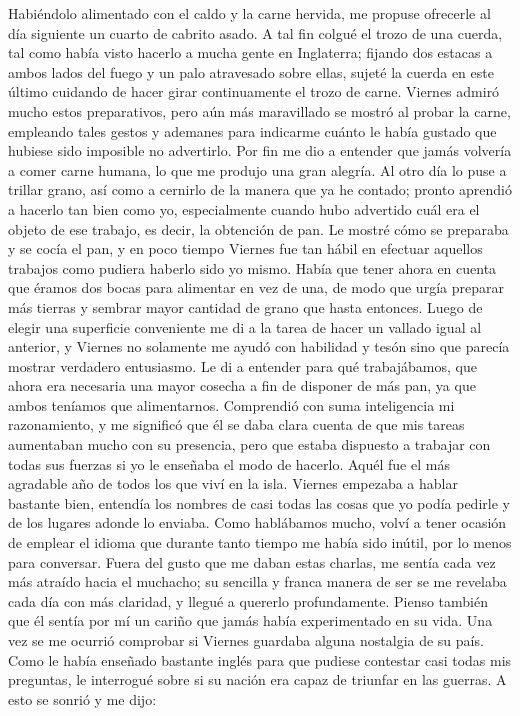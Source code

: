 \documentclass{novela}
\begin{document}
    Habiéndolo alimentado con el caldo y la carne hervida, me propuse ofrecerle al día siguiente un cuarto de cabrito asado. A tal fin colgué el trozo de una cuerda, tal como había visto hacerlo a mucha gente en Inglaterra; fijando dos estacas a ambos lados del fuego y un palo atravesado sobre ellas, sujeté la cuerda en este último cuidando de hacer girar continuamente el trozo de carne. Viernes admiró mucho estos preparativos, pero aún más maravillado se mostró al probar la carne, empleando tales gestos y ademanes para indicarme cuánto le había gustado que hubiese sido imposible no advertirlo. Por fin me dio a entender que jamás volvería a comer carne humana, lo que me produjo una gran alegría.
    Al otro día lo puse a trillar grano, así como a cernirlo de la manera que ya he contado; pronto aprendió a hacerlo tan bien como yo, especialmente cuando hubo advertido cuál era el objeto de ese trabajo, es decir, la obtención de pan. Le mostré cómo se preparaba y se cocía el pan, y en poco tiempo Viernes fue tan hábil en efectuar aquellos trabajos como pudiera haberlo sido yo mismo.
    Había que tener ahora en cuenta que éramos dos bocas para alimentar en vez de una, de modo que urgía preparar más tierras y sembrar mayor cantidad de grano que hasta entonces. Luego de elegir una superficie conveniente me di a la tarea de hacer un vallado igual al anterior, y Viernes no solamente me ayudó con habilidad y tesón sino que parecía mostrar verdadero entusiasmo. Le di a entender para qué trabajábamos, que ahora era necesaria una mayor cosecha a fin de disponer de más pan, ya que ambos teníamos que alimentarnos.
    Comprendió con suma inteligencia mi razonamiento, y me significó que él se daba clara cuenta de que mis tareas aumentaban mucho con su presencia, pero que estaba dispuesto a trabajar con todas sus fuerzas si yo le enseñaba el modo de hacerlo.
    Aquél fue el más agradable año de todos los que viví en la isla. Viernes empezaba a hablar bastante bien, entendía los nombres de casi todas las cosas que yo podía pedirle y de los lugares adonde lo enviaba. Como hablábamos mucho, volví a tener ocasión de emplear el idioma que durante tanto tiempo me había sido inútil, por lo menos para conversar. Fuera del gusto que me daban estas charlas, me sentía cada vez más atraído hacia el muchacho; su sencilla y franca manera de ser se me revelaba cada día con más claridad, y llegué a quererlo profundamente. Pienso también que él sentía por mí un cariño que jamás había experimentado en su vida.
    Una vez se me ocurrió comprobar si Viernes guardaba alguna nostalgia de su país. Como le había enseñado bastante inglés para que pudiese contestar casi todas mis preguntas, le interrogué sobre si su nación era capaz de triunfar en las guerras. A esto se sonrió y me dijo:
\end{document}
